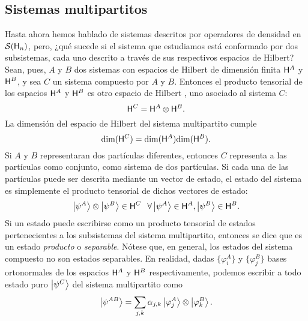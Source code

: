 \subsection{Sistemas multipartitos}\label{sec:Ch1PartialTrace}
Hasta ahora hemos hablado de sistemas descritos por operadores de densidad en $\mathcal{S}({\sf H}_{n})$, pero, ¿qué sucede si el sistema que estudiamos está conformado por dos subsistemas, cada uno descrito a través de sus respectivos espacios de Hilbert? Sean, pues, $A$ y $B$ dos sistemas con espacios de Hilbert de dimensión finita ${\sf H}^{A}$ y ${\sf H}^{B}$, y sea $C$ un sistema compuesto por $A$ y $B$. Entonces el producto tensorial de los espacios ${\sf H}^{A}$ y ${\sf H}^{B}$ es otro espacio de Hilbert , uno asociado al sistema $C$:
 \begin{equation}
     {\sf H}^{C}={\sf H}^{A}\otimes{\sf H}^{B}.\nonumber
 \end{equation}
 La dimensión del espacio de Hilbert del sistema multipartito cumple
\begin{equation}
    \text{dim}({\sf H}^{C})=\text{dim}({\sf H}^{A})\text{dim}({\sf H}^{B}).\nonumber
\end{equation}
Si $A$ y $B$ representaran dos partículas diferentes, entonces $C$ representa a las partículas como conjunto, como sistema de dos partículas. Si cada una de las partículas puede ser descrita mediante un vector de estado, el estado del sistema es simplemente el producto tensorial de dichos vectores de estado:
\begin{equation}
    \ket{\psi^{A}}\otimes\ket{\psi^{B}}\in{\sf H}^{C}\,\; \; \forall\ket{\psi^{A}}\in{\sf H}^{A},\ket{\psi^{B}}\in{\sf H}^{B}.\nonumber
\end{equation}
Si un estado puede escribirse como un producto tensorial de estados pertenecientes a los subsistemas del sistema multipartito, entonces se dice que es un estado \textit{producto} o \textit{separable}. Nótese que, en general, los estados del sistema compuesto no son estados separables. En realidad, dadas $\{\varphi_{i}^{A}\}$ y $\{\varphi_{j}^{B}\}$ bases ortonormales de los espacios ${\sf H}^{A}$ y ${\sf H}^{B}$ respectivamente, podemos escribir a todo estado puro $\ket{\psi^{C}}$ del sistema multipartito como
\begin{equation}
    \ket{\psi^{AB}}=\sum_{j,k}\alpha_{j,k}\ket{\varphi_{j}^{A}}\otimes\ket{\varphi_{k}^{B}}.\nonumber
\end{equation}
